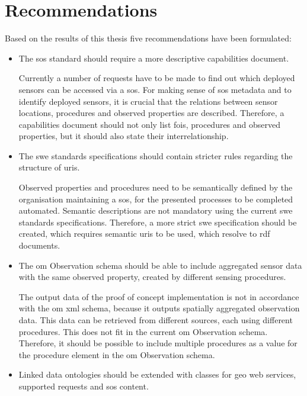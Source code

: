 \section{Recommendations}

Based on the results of this thesis five recommendations have been formulated: 

\begin{itemize}
	\item The \ac{sos} standard should require a more descriptive capabilities document.
	
	Currently a number of requests have to be made to find out which deployed sensors can be accessed via a \ac{sos}. For making sense of \ac{sos} metadata and to identify deployed sensors, it is crucial that the relations between sensor locations, procedures and observed properties are described. Therefore, a capabilities document should not only list \acp{foi}, procedures and observed properties, but it should also state their interrelationship.    
	
	
	\item The \ac{swe} standards specifications should contain stricter rules regarding the structure of \acp{uri}.
	
	Observed properties and procedures need to be semantically defined by the organisation maintaining a \ac{sos}, for the presented processes to be completed automated. Semantic descriptions are not mandatory using the current \ac{swe} standards specifications. Therefore, a more strict \ac{swe} specification should be created, which requires semantic \acp{uri} to be used, which resolve to \ac{rdf} documents. 
	
	
	\item The \ac{om} Observation schema should be able to include aggregated sensor data with the same observed property, created by different sensing procedures. 
	
	The output data of the proof of concept implementation is not in accordance with the \ac{om} \ac{xml} schema, because it outputs spatially aggregated observation data. This data can be retrieved from different sources, each using different procedures. This does not fit in the current \ac{om} Observation schema. Therefore, it should be possible to include multiple procedures as a value for the procedure element in the \ac{om} Observation schema.   

	
	\item Linked data ontologies should be extended with classes for geo web services, supported requests and \ac{sos} content.
	

\end{itemize}
